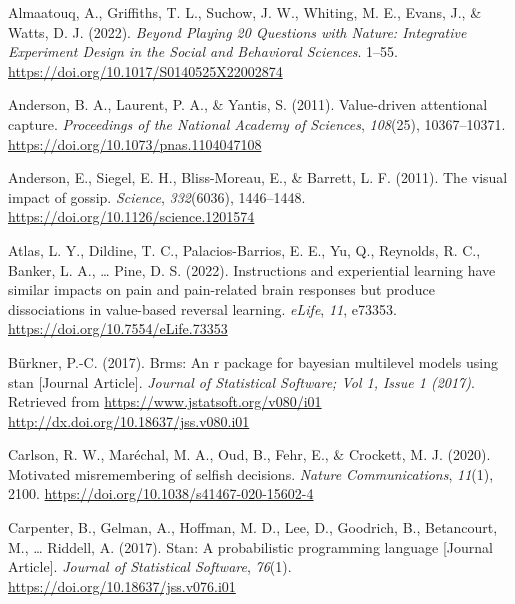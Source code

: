 \documentclass[
  man]{apa6}
\newlength{\cslhangindent}
\newlength{\cslentryspacingunit} %
\newenvironment{CSLReferences}[2] %
 {%
  \setlength{\parindent}{0pt}
  \ifodd #1
  \let\oldpar\par
  \def\par{\hangindent=\cslhangindent\oldpar}
  \fi
  \setlength{\parskip}{#2\cslentryspacingunit}
 }%
 {}
\begin{document}
\hypertarget{refs}{}
\begin{CSLReferences}{1}{0}
\leavevmode{}%
Almaatouq, A., Griffiths, T. L., Suchow, J. W., Whiting, M. E., Evans, J., \& Watts, D. J. (2022). \emph{Beyond {Playing} 20 {Questions} with {Nature}: {Integrative} {Experiment} {Design} in the {Social} and {Behavioral} {Sciences}}. 1--55. \url{https://doi.org/10.1017/S0140525X22002874}

\leavevmode{}%
Anderson, B. A., Laurent, P. A., \& Yantis, S. (2011). Value-driven attentional capture. \emph{Proceedings of the National Academy of Sciences}, \emph{108}(25), 10367--10371. \url{https://doi.org/10.1073/pnas.1104047108}

\leavevmode{}%
Anderson, E., Siegel, E. H., Bliss-Moreau, E., \& Barrett, L. F. (2011). The visual impact of gossip. \emph{Science}, \emph{332}(6036), 1446--1448. \url{https://doi.org/10.1126/science.1201574}

\leavevmode{}%
Atlas, L. Y., Dildine, T. C., Palacios-Barrios, E. E., Yu, Q., Reynolds, R. C., Banker, L. A., \ldots{} Pine, D. S. (2022). Instructions and experiential learning have similar impacts on pain and pain-related brain responses but produce dissociations in value-based reversal learning. \emph{eLife}, \emph{11}, e73353. \url{https://doi.org/10.7554/eLife.73353}

\leavevmode{}%
Bürkner, P.-C. (2017). Brms: An r package for bayesian multilevel models using stan {[}Journal Article{]}. \emph{Journal of Statistical Software; Vol 1, Issue 1 (2017)}. Retrieved from \href{https://www.jstatsoft.org/v080/i01\%0Ahttp://dx.doi.org/10.18637/jss.v080.i01}{https://www.jstatsoft.org/v080/i01
http://dx.doi.org/10.18637/jss.v080.i01}

\leavevmode{}%
Carlson, R. W., Maréchal, M. A., Oud, B., Fehr, E., \& Crockett, M. J. (2020). Motivated misremembering of selfish decisions. \emph{Nature Communications}, \emph{11}(1), 2100. \url{https://doi.org/10.1038/s41467-020-15602-4}

\leavevmode{}%
Carpenter, B., Gelman, A., Hoffman, M. D., Lee, D., Goodrich, B., Betancourt, M., \ldots{} Riddell, A. (2017). Stan: A probabilistic programming language {[}Journal Article{]}. \emph{Journal of Statistical Software}, \emph{76}(1). \url{https://doi.org/10.18637/jss.v076.i01}


\end{CSLReferences}
\end{document}
